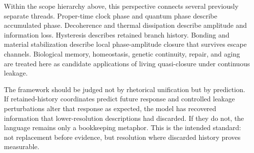 \documentclass[11pt,a4paper]{article}
\begin{document}
Within the scope hierarchy above, this perspective connects several previously separate threads.  Proper-time clock phase and quantum phase describe accumulated phase.  Decoherence and thermal dissipation describe amplitude and information loss.  Hysteresis describes retained branch history.  Bonding and material stabilization describe local phase-amplitude closure that survives escape channels.  Biological memory, homeostasis, genetic continuity, repair, and aging are treated here as candidate applications of living quasi-closure under continuous leakage.

The framework should be judged not by rhetorical unification but by prediction.  If retained-history coordinates predict future response and controlled leakage perturbations alter that response as expected, the model has recovered information that lower-resolution descriptions had discarded.  If they do not, the language remains only a bookkeeping metaphor.  This is the intended standard: not replacement before evidence, but resolution where discarded history proves measurable.
\end{document}
